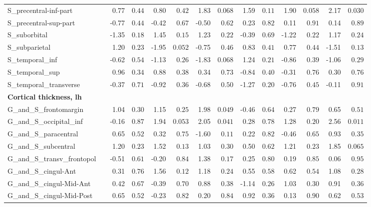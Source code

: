 {\begin{longtable}{llrrrrrrrrrrrr}
S\_precentral-inf-part &  & 0.77 & $0.44$ & 0.80 & $0.42$ & 1.83 & $0.068$ & 1.59 & $0.11$ & 1.90 & $0.058$ & 2.17 & $0.030$ \\
S\_precentral-sup-part &  & -0.77 & $0.44$ & -0.42 & $0.67$ & -0.50 & $0.62$ & 0.23 & $0.82$ & 0.11 & $0.91$ & 0.14 & $0.89$ \\
S\_suborbital &  & -1.35 & $0.18$ & 1.45 & $0.15$ & 1.23 & $0.22$ & -0.39 & $0.69$ & -1.22 & $0.22$ & 1.17 & $0.24$ \\
S\_subparietal &  & 1.20 & $0.23$ & -1.95 & $0.052$ & -0.75 & $0.46$ & 0.83 & $0.41$ & 0.77 & $0.44$ & -1.51 & $0.13$ \\
S\_temporal\_inf &  & -0.62 & $0.54$ & -1.13 & $0.26$ & -1.83 & $0.068$ & 1.24 & $0.21$ & -0.86 & $0.39$ & -1.06 & $0.29$ \\
S\_temporal\_sup &  & 0.96 & $0.34$ & 0.88 & $0.38$ & 0.34 & $0.73$ & -0.84 & $0.40$ & -0.31 & $0.76$ & 0.30 & $0.76$ \\
S\_temporal\_transverse &  & -0.37 & $0.71$ & -0.92 & $0.36$ & -0.68 & $0.50$ & -1.27 & $0.20$ & -0.76 & $0.45$ & -0.11 & $0.91$ \\
\midrule\multicolumn{14}{l}{\textbf{Cortical thickness, lh}} \\
G\_and\_S\_frontomargin &  & 1.04 & $0.30$ & 1.15 & $0.25$ & 1.98 & $0.049$ & -0.46 & $0.64$ & 0.27 & $0.79$ & 0.65 & $0.51$ \\
G\_and\_S\_occipital\_inf &  & -0.16 & $0.87$ & 1.94 & $0.053$ & 2.05 & $0.041$ & 0.28 & $0.78$ & 1.28 & $0.20$ & 2.56 & $0.011$ \\
G\_and\_S\_paracentral &  & 0.65 & $0.52$ & 0.32 & $0.75$ & -1.60 & $0.11$ & 0.22 & $0.82$ & -0.46 & $0.65$ & 0.93 & $0.35$ \\
G\_and\_S\_subcentral &  & 1.20 & $0.23$ & 1.52 & $0.13$ & 1.03 & $0.30$ & 0.50 & $0.62$ & 1.21 & $0.23$ & 1.85 & $0.065$ \\
G\_and\_S\_transv\_frontopol &  & -0.51 & $0.61$ & -0.20 & $0.84$ & 1.38 & $0.17$ & 0.25 & $0.80$ & 0.19 & $0.85$ & 0.06 & $0.95$ \\
G\_and\_S\_cingul-Ant &  & 0.31 & $0.76$ & 1.56 & $0.12$ & 1.18 & $0.24$ & 0.55 & $0.58$ & 0.62 & $0.54$ & 1.08 & $0.28$ \\
G\_and\_S\_cingul-Mid-Ant &  & 0.42 & $0.67$ & -0.39 & $0.70$ & 0.88 & $0.38$ & -1.14 & $0.26$ & 1.03 & $0.30$ & 0.91 & $0.36$ \\
G\_and\_S\_cingul-Mid-Post &  & 0.65 & $0.52$ & -0.23 & $0.82$ & 0.20 & $0.84$ & 0.92 & $0.36$ & 0.13 & $0.90$ & 0.62 & $0.53$ \\

\end{longtable}}
